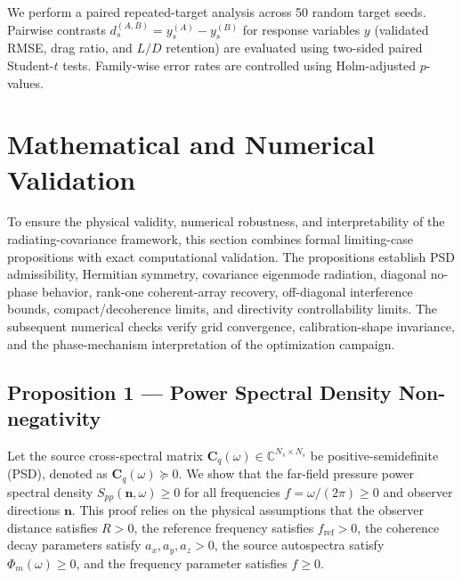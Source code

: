 \documentclass[11pt]{article}
\newcommand{\vect}[1]{\bm{#1}}
\newcommand{\mat}[1]{\bm{#1}}
\begin{document}
We perform a paired repeated-target analysis across 50 random target seeds. Pairwise contrasts $d_s^{(A,B)} = y_s^{(A)} - y_s^{(B)}$ for response variables $y$ (validated RMSE, drag ratio, and $L/D$ retention) are evaluated using two-sided paired Student-$t$ tests. Family-wise error rates are controlled using Holm-adjusted $p$-values.

\section{Mathematical and Numerical Validation}

To ensure the physical validity, numerical robustness, and interpretability of the radiating-covariance framework, this section combines formal limiting-case propositions with exact computational validation. The propositions establish PSD admissibility, Hermitian symmetry, covariance eigenmode radiation, diagonal no-phase behavior, rank-one coherent-array recovery, off-diagonal interference bounds, compact/decoherence limits, and directivity controllability limits. The subsequent numerical checks verify grid convergence, calibration-shape invariance, and the phase-mechanism interpretation of the optimization campaign.

\subsection{Proposition 1 --- Power Spectral Density Non-negativity}

Let the source cross-spectral matrix $\mat{C}_q(\omega) \in \mathbb{C}^{N_s \times N_s}$ be positive-semidefinite (PSD), denoted as $\mat{C}_q(\omega) \succeq 0$. We show that the far-field pressure power spectral density $S_{pp}(\vect{n},\omega) \ge 0$ for all frequencies $f = \omega / (2\pi) \ge 0$ and observer directions $\vect{n}$. This proof relies on the physical assumptions that the observer distance satisfies $R > 0$, the reference frequency satisfies $f_{\mathrm{ref}} > 0$, the coherence decay parameters satisfy $a_x, a_y, a_z > 0$, the source autospectra satisfy $\Phi_m(\omega) \ge 0$, and the frequency parameter satisfies $f \ge 0$.
\end{document}
